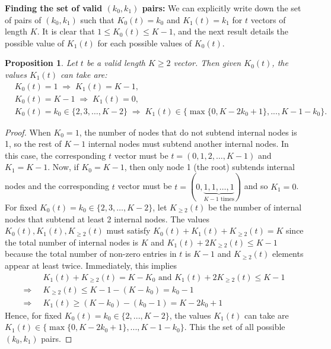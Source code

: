 \documentclass{article}
\newtheorem{proposition}[theorem]{Proposition}
\begin{document}
\noindent \textbf{Finding the set of valid $(k_0, k_1)$ pairs:} We can explicitly write down the set of pairs of $(k_0,k_1)$ such that $K_0(t)=k_0$ and $K_1(t)=k_1$ for $t$ vectors of length $K$. It is clear that $1 \leq K_0(t) \leq K-1$, and the next result details the possible value of $K_1(t)$ for each possible values of $K_0(t)$. 
\begin{proposition}\label{prop:valid-k0-k1-pairs}
Let $t$ be a valid length $K\geq 2$ vector. Then given $K_0(t)$, the values $K_1(t)$ can take are: 
\begin{align*}
    &K_0(t) = 1 \; \Rightarrow\; K_1(t) = K-1, \\
    & K_0(t) = K-1 \; \Rightarrow \; K_1(t) = 0, \\
    &K_0(t) = k_0  \in \{2, 3, \ldots, K-2\} \; \Rightarrow \; K_1(t) \in \Big \{ \max\{0, K-2k_0+1\}, ..., K-1-k_0 \Big \}.
\end{align*}
\end{proposition}
\begin{proof}
When $K_{0}=1$, the number of nodes that do not subtend internal nodes is 1, so the rest of $K-1$ internal nodes must subtend another internal nodes. In this case, the corresponding $t$ vector must be $t=(0,1,2,\ldots,K-1)$ and $K_1=K-1$. Now, if $K_0=K-1$, then only node 1 (the root) subtends internal nodes and the corresponding $t$ vector must be $t=(0,\underbrace{1,1,\ldots,1}_{K-1 \text{ times}})$ and so $K_1=0$. \\

\noindent For fixed $K_0(t)= k_0 \in \{2, 3, \ldots, K-2\}$, let $K_{\geq 2}(t)$ be the number of internal nodes that subtend at least 2 internal nodes.
The values $K_0(t), K_1(t), K_{\geq 2}(t)$ must satisfy $K_0(t) + K_1(t) + K_{\geq 2}(t) = K$ since the total number of internal nodes is $K$ and $K_1(t) + 2 K_{\geq 2}(t) \leq K-1$ because the total number of non-zero entries in $t$ is $K-1$ and $K_{\geq 2}(t)$ elements appear at least twice. Immediately, this implies 
\begin{align*}
    & K_1(t) + K_{\geq 2}(t) = K-K_0 \text{ and } K_1(t) + 2 K_{\geq 2}(t) \leq K-1 \\
    \Rightarrow \;\; & K_{\geq 2}(t) \leq K-1-(K-k_0) = k_0-1 \\
    \Rightarrow \;\; & K_1(t) \geq (K-k_0) -(k_0-1) = K-2k_0+1 
\end{align*}
Hence, for fixed $K_0(t)= k_0 \in \{2,...,K-2\}$, the values $K_1(t)$ can take are $K_1(t) \in \big \{\max\{0, K-2k_0+1\},..., K-1-k_0\big \}$. This the set of all possible $(k_0, k_1)$ pairs. 
\end{proof}
\end{document}
